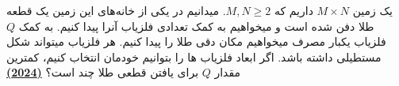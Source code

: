 یک زمین $M \times N$ داریم که $M, N \ge 2$.
میدانیم در یکی از خانه‌های این زمین یک قطعه طلا دفن شده است و میخواهیم به کمک تعدادی فلزیاب آنرا پیدا کنیم.
به کمک $Q$ فلزیاب یکبار مصرف میخواهیم مکان دقی طلا را پیدا کنیم.
هر فلزیاب میتواند شکل مستطیلی داشته باشد.
اگر ابعاد فلزیاب ها را بتوانیم خودمان انتخاب کنیم، کمترین مقدار $Q$ برای یافتن قطعی طلا چند است؟
\href{https://artofproblemsolving.com/community/c6h3272717p30115345}{\textbf{(2024)}}
